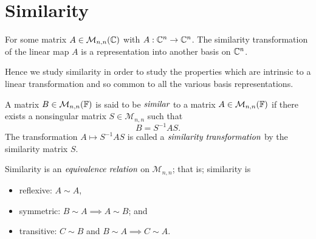 
\section{Similarity} %
\label{sec:similarity}

For some matrix $A \in \mathcal{M}_{n,n}(\mathbb{C})$ with $A: \mathbb{C}^n \to \mathbb{C}^n$.
The similarity transformation of the linear map $A$ is a representation
into another basis on $\mathbb{C}^n$.

Hence we study similarity in order to study the properties which are
intrinsic to a linear transformation and so common to all the various
basis representations.

\begin{defn}[Similarity]
	A matrix $B \in \mathcal{M}_{n,n}(\mathbb{F})$ is said to be $\emph{similar}$
	to a matrix $A \in \mathcal{M}_{n,n}(\mathbb{F})$ if there exists a
	nonsingular matrix $S \in \mathcal{M}_{n,n}$ such that
	\[
		B = S^{-1} A S.
	\]
	The transformation $A \mapsto S^{-1} A S$ is called a $\emph{similarity transformation}$
	by the similarity matrix $S$.
\end{defn}

\begin{prop}
	Similarity is an $\emph{equivalence relation}$ on $\mathcal{M}_{n,n}$;
	that is; similarity is
	\begin{itemize}
		\item reflexive: $A \sim A$,
		\item symmetric: $B \sim A \implies A \sim B$; and
		\item transitive: $C \sim B$ and $B \sim A \implies C \sim A$.
	\end{itemize}
\end{prop}

